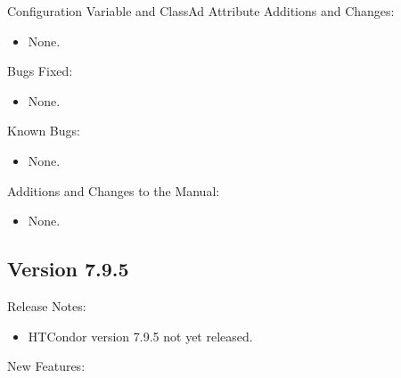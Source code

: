 \noindent Configuration Variable and ClassAd Attribute Additions and Changes:

\begin{itemize}

\item None.

\end{itemize}

\noindent Bugs Fixed:

\begin{itemize}

\item None.

\end{itemize}

\noindent Known Bugs:

\begin{itemize}

\item None.

\end{itemize}

\noindent Additions and Changes to the Manual:

\begin{itemize}

\item None.

\end{itemize}


\subsection*{\label{sec:New-7-6-0}Version 7.9.5}

\noindent Release Notes:

\begin{itemize}

\item HTCondor version 7.9.5 not yet released.

\end{itemize}


\noindent New Features:

